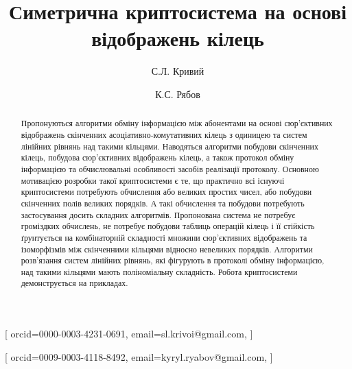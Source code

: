 \documentclass{ceurart}
\begin{document}


\title{Симетрична криптосистема на основі відображень кілець}


\author[1]{С.Л. Кривий}[%
orcid=0000-0003-4231-0691, %
email={sl.krivoi@gmail.com},
]
\address[1]{Київський національний університет імені Тараса Шевченка, проспект Академіка Глушкова 4д, Київ, 03680, Україна} %

\author[1]{К.С. Рябов}[%
orcid=0009-0003-4118-8492, %
email={kyryl.ryabov@gmail.com},
]



\begin{abstract}
 Пропонуються алгоритми обміну інформацією між абонентами на основі
 сюр'єктивних відображень скінченних асоціативно-комутативних кілець з
 одиницею та систем лінійних рівнянь над такими кільцями. Наводяться
 алгоритми побудови скінченних кілець, побудова
 сюр'єктивних відображень кілець,  а також протокол обміну
 інформацією та обчислювальні особливості засобів реалізації
 протоколу. Основною мотивацією розробки такої криптосистеми є
 те, що практично всі існуючі криптосистеми потребують обчислення
 або великих простих чисел,  або побудови скінченних полів великих
 порядків. А такі обчислення та побудови потребують застосування
 досить складних алгоритмів. Пропонована система не потребує
 громіздких обчислень, не потребує побудови таблиць операцій кілець
 і її стійкість ґрунтується на комбінаторній складності множини
 сюр'єктивних відображень та ізоморфізмів між скінченними кільцями
 відносно невеликих порядків. Алгоритми розв'язання систем лінійних
 рівнянь, які фігурують в протоколі обміну інформацією,  над такими
 кільцями мають поліноміальну складність.
 Робота криптосистеми демонструється на прикладах.
\end{abstract}
\end{document}
